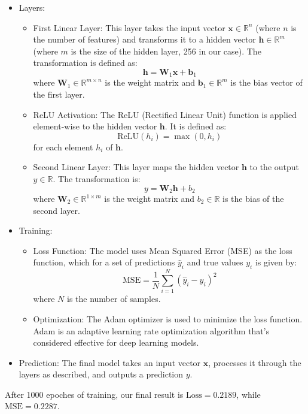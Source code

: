 \documentclass[11pt,a4paper]{article}
\begin{document}
	\begin{itemize}
		\item Layers:
		\begin{itemize}
			\item First Linear Layer: This layer takes the input vector \( \mathbf{x} \in \mathbb{R}^{n} \) (where \( n \) is the number of features) and transforms it to a hidden vector \( \mathbf{h} \in \mathbb{R}^{m} \) (where \( m \) is the size of the hidden layer, 256 in our case). The transformation is defined as: 
			\[ \mathbf{h} = \mathbf{W}_1 \mathbf{x} + \mathbf{b}_1 \]
			where \( \mathbf{W}_1 \in \mathbb{R}^{m \times n} \) is the weight matrix and \( \mathbf{b}_1 \in \mathbb{R}^{m} \) is the bias vector of the first layer.
			\item ReLU Activation: The ReLU (Rectified Linear Unit) function is applied element-wise to the hidden vector \( \mathbf{h} \). It is defined as:
			\[ \text{ReLU}(h_i) = \max(0, h_i) \]
			for each element \( h_i \) of \( \mathbf{h} \).
			\item Second Linear Layer: This layer maps the hidden vector \( \mathbf{h} \) to the output \( y \in \mathbb{R} \). The transformation is:
			\[ y = \mathbf{W}_2 \mathbf{h} + b_2 \]
			where \( \mathbf{W}_2 \in \mathbb{R}^{1 \times m} \) is the weight matrix and \( b_2 \in \mathbb{R} \) is the bias of the second layer.
		\end{itemize}
		\item  Training:
		\begin{itemize}
			\item Loss Function: The model uses Mean Squared Error (MSE) as the loss function, which for a set of predictions \( \hat{y}_i \) and true values \( y_i \) is given by:
			\[ \text{MSE} = \frac{1}{N} \sum_{i=1}^{N} (\hat{y}_i - y_i)^2 \]
			where \( N \) is the number of samples.
			\item Optimization: The Adam optimizer is used to minimize the loss function. Adam is an adaptive learning rate optimization algorithm that's considered effective for deep learning models.
		\end{itemize}
		\item Prediction: The final model takes an input vector \( \mathbf{x} \), processes it through the layers as described, and outputs a prediction \( y \).		
	\end{itemize}
	
	After 1000 epoches of training, our final result is $\text{Loss}=0.2189$, while $\text{MSE}=0.2287$. 
	
\end{document}
